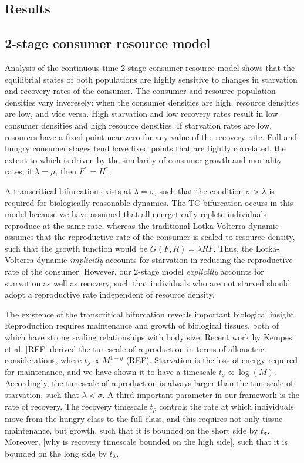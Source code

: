 \documentclass[12pt,english]{article}
\begin{document}
\begin{spacing}{1.9}
\section{Results}

\subsection{2-stage consumer resource model}

Analysis of the continuous-time 2-stage consumer resource model shows that the equilibrial states of both populations are highly sensitive to changes in  starvation and recovery rates of the consumer.
The consumer and resource population densities vary inveresely: when the consumer densities are high, resource densities are low, and vice versa.
High starvation and low recovery rates result in low consumer densities and high resource densities. %
If starvation rates are low, resources have a fixed point near zero for any value of the recovery rate.
Full and hungry consumer stages tend have fixed points that are tightly correlated, the extent to which is driven by the similarity of consumer growth and mortality rates; if $\lambda = \mu$, then $F^* = H^*$.

A transcritical bifurcation exists at $\lambda = \sigma$, such that the condition $\sigma > \lambda$ is required for biologically reasonable dynamics.
The TC bifurcation occurs in this model because we have assumed that all energetically replete individuals reproduce at the same rate, whereas the traditional Lotka-Volterra dynamic assumes that the reproductive rate of the consumer is scaled to resource density, such that the growth function would be $G(F,R) = \lambda R F$.
Thus, the Lotka-Volterra dynamic \emph{implicitly} accounts for starvation in reducing the reproductive rate of the consumer.
However, our 2-stage model \emph{explicitly} accounts for starvation as well as recovery, such that individuals who are not starved should adopt a reproductive rate independent of resource density.

The existence of the transcritical bifurcation reveals important biological insight.
Reproduction requires maintenance and growth of biological tissues, both of which have strong scaling relationships with body size.
Recent work by Kempes et al. [REF] derived the timescale of reproduction in terms of allometric considerations, where $t_\lambda \propto M^{1-\eta}$ (REF).
Starvation is the loss of energy required for maintenance, and we have shown it to have a timescale $t_\sigma \propto \log(M)$.
Accordingly, the timescale of reproduction is always larger than the timescale of starvation, such that $\lambda < \sigma$.
A third important parameter in our framework is the rate of recovery.
The recovery timescale $t_\rho$ controls the rate at which individuals move from the hungry class to the full class, and this requires not only tissue maintenance, but growth, such that it is bounded on the short side by $t_\sigma$.
Moreover, [why is recovery timescale bounded on the high side], such that it is bounded on the long side by $t_\lambda$.


\end{spacing}
\end{document}
